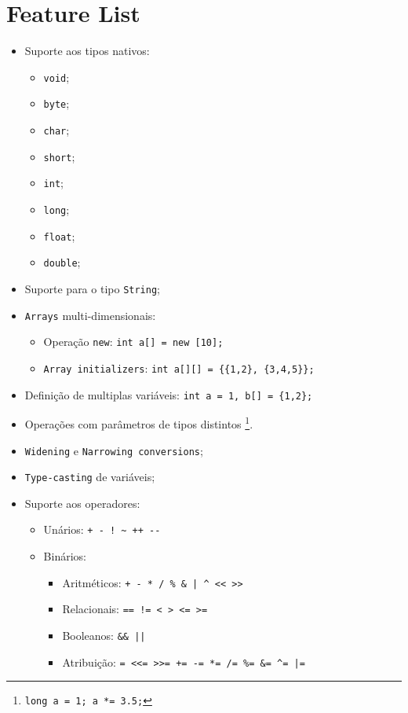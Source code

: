 \documentclass[a4paper]{article}
\begin{document}
\section{Feature List}
\begin{itemize}
	\item Suporte aos tipos nativos:
	\begin{itemize}
		\item \texttt{void};
		\item \texttt{byte};
		\item \texttt{char};
		\item \texttt{short};
		\item \texttt{int};
		\item \texttt{long};
		\item \texttt{float};
		\item \texttt{double};
	\end{itemize}
	\item Suporte para o tipo \texttt{String};%
	\item \texttt{Arrays} multi-dimensionais:
	\begin{itemize}
		\item Operação \texttt{new}: \quad \texttt{int a[] = new [10];}
		\item \texttt{Array initializers}: \quad \texttt{int a[][] = \{\{1,2\}, \{3,4,5\}\}; }
	\end{itemize}
	\item Definição de multiplas variáveis: \quad \texttt{int a = 1, b[] = \{1,2\}; }
	\item Operações com parâmetros de tipos distintos \footnote[1]{\texttt{long a = 1; a *= 3.5;}}.
	\item \texttt{Widening} e \texttt{Narrowing conversions};
	\item \texttt{Type-casting} de variáveis;
	\item Suporte aos operadores:
	\begin{itemize}
		\item Unários: \quad \verb|+ - ! ~ ++ --|
		\item Binários:
		\begin{itemize}
			\item Aritméticos: \quad \verb!+ - * / % & | ^ << >>!
			\item Relacionais: \quad \verb|== != < > <= >=|
			\item Booleanos: \quad \verb!&& ||!
			\item Atribuição: \quad \verb!= <<= >>= += -= *= /= %= &= ^= |=!

\end{itemize}
\end{itemize}
\end{itemize}
\end{document}
